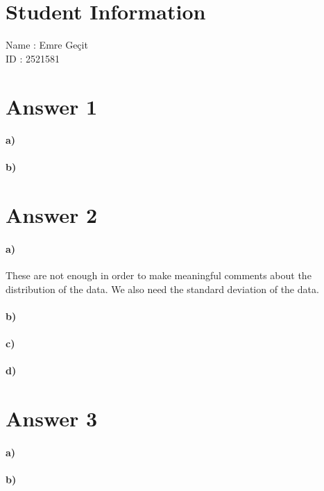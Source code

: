 \documentclass[12pt]{article}
\begin{document}
\section*{Student Information}

Name : Emre Geçit\\

ID : 2521581\\


\section*{Answer 1}
\paragraph{a)}
\paragraph{b)}

\section*{Answer 2}
\paragraph{a)}
These are not enough in order to make meaningful comments about the distribution of the data. We also need the standard deviation of the data.
\paragraph{b)}

\paragraph{c)}
\paragraph{d)}

\section*{Answer 3}
\paragraph{a)}
\paragraph{b)}
\end{document}

